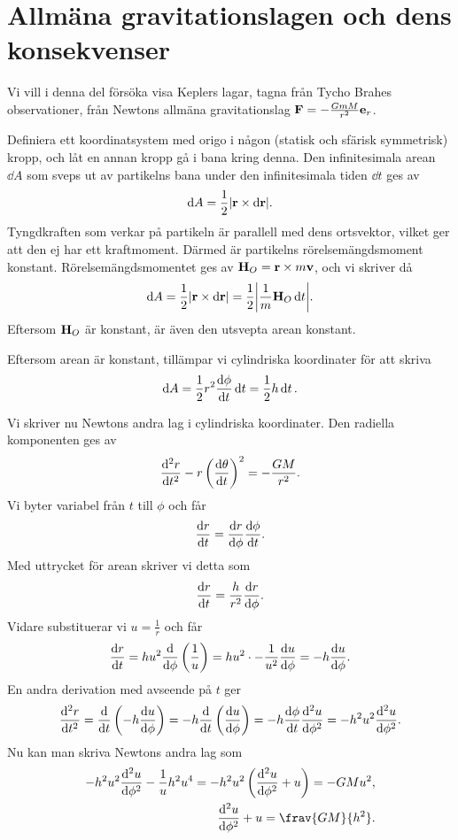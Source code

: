 \section{Allmäna gravitationslagen och dens konsekvenser}

Vi vill i denna del försöka visa Keplers lagar, tagna från Tycho Brahes observationer, från Newtons allmäna gravitationslag $\vb{F} = -\frac{GmM}{r^2}\vb{e}_{r}$.

Definiera ett koordinatsystem med origo i någon (statisk och sfärisk symmetrisk) kropp, och låt en annan kropp gå i bana kring denna. Den infinitesimala arean $\dd{A}$ som sveps ut av partikelns bana under den infinitesimala tiden $\dd{t}$ ges av
\begin{align*}
	\dd{A} = \frac{1}{2}\abs{\vb{r}\times\dd{\vb{r}}}.
\end{align*}
Tyngdkraften som verkar på partikeln är parallell med dens ortsvektor, vilket ger att den ej har ett kraftmoment. Därmed är partikelns rörelsemängdsmoment konstant. Rörelsemängdsmomentet ges av $\vb{H}_{O} = \vb{r}\times m\vb{v}$, och vi skriver då
\begin{align*}
	\dd{A} = \frac{1}{2}\abs{\vb{r}\times\dd{\vb{r}}} = \frac{1}{2}\abs{\frac{1}{m}\vb{H}_{O}\dd{t}}.
\end{align*}
Eftersom $\vb{H}_{O}$ är konstant, är även den utsvepta arean konstant.

Eftersom arean är konstant, tillämpar vi cylindriska koordinater för att skriva
\begin{align*}
	\dd{A} = \frac{1}{2}r^2\dv{\phi}{t}\dd{t} = \frac{1}{2}h\dd{t}.
\end{align*}

Vi skriver nu Newtons andra lag i cylindriska koordinater. Den radiella komponenten ges av
\begin{align*}
	\dv[2]{r}{t} - r\left(\dv{\theta}{t}\right)^2 = -\frac{GM}{r^2}.
\end{align*}
Vi byter variabel från $t$ till $\phi$ och får
\begin{align*}
	\dv{r}{t} = \dv{r}{\phi}\dv{\phi}{t}.
\end{align*}
Med uttrycket för arean skriver vi detta som
\begin{align*}
	\dv{r}{t} = \frac{h}{r^2}\dv{r}{\phi}.
\end{align*}
Vidare substituerar vi $u = \frac{1}{r}$ och får
\begin{align*}
	\dv{r}{t} = hu^2\dv{\phi}\left(\frac{1}{u}\right) = hu^2\cdot -\frac{1}{u^2}\dv{u}{\phi} = -h\dv{u}{\phi}.
\end{align*}
En andra derivation med avseende på $t$ ger
\begin{align*}
	\dv[2]{r}{t} = \dv{t}\left(-h\dv{u}{\phi}\right) = -h\dv{t}\left(\dv{u}{\phi}\right) = -h\dv{\phi}{t}\dv[2]{u}{\phi} = -h^2u^2\dv[2]{u}{\phi}.
\end{align*}
Nu kan man skriva Newtons andra lag som
\begin{align*}
	-h^2u^2\dv[2]{u}{\phi} - \frac{1}{u}h^2u^4 = -h^2u^2\left(\dv[2]{u}{\phi} + u\right) = -GMu^2, \\
	\dv[2]{u}{\phi} + u = \frav{GM}{h^2}.
\end{align*}